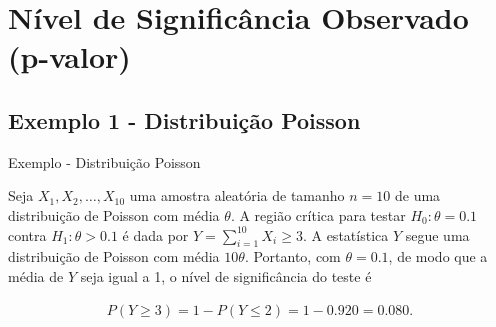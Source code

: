 \documentclass[12pt]{beamer}
\begin{document}
%
%
%

\section{Nível de Significância Observado (p-valor)}

\subsection{Exemplo 1 - Distribuição Poisson}
\begin{frame}{Exemplo - Distribuição Poisson}
	\begin{block}{}
		\justifying
		Seja $X_1, X_2, \ldots, X_{10}$ uma amostra aleatória de tamanho $n = 10$ de uma distribuição de Poisson com média $\theta$. A região crítica para testar $H_0 : \theta = 0.1$ contra $H_1 : \theta > 0.1$ é dada por $Y = {\displaystyle \sum_{i=1}^{10}} X_i \geq 3$. A estatística $Y$ segue uma distribuição de Poisson com média $10\theta$. Portanto, com $\theta = 0.1$, de modo que a média de $Y$ seja igual a 1, o nível de significância do teste é
		
		\begin{align*}
			P(Y \geq 3) = 1 - P(Y \leq 2) = 1 - 0.920 = 0.080.
		\end{align*}
	\end{block}
\end{frame}
\end{document}
